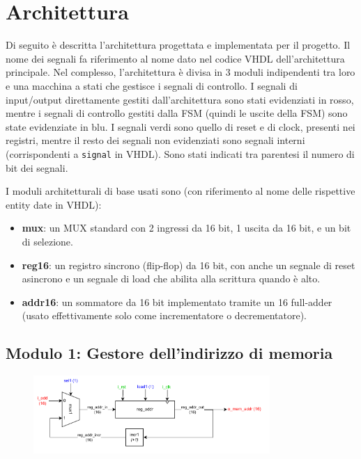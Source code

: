 \documentclass{article}
\begin{document}
\section{Architettura}
Di seguito è descritta l’architettura progettata e implementata per il progetto. Il nome dei segnali fa riferimento al nome dato nel codice VHDL dell’architettura principale. Nel complesso, l’architettura è divisa in 3 moduli indipendenti tra loro e una macchina a stati che gestisce i segnali di controllo. I segnali di input/output direttamente gestiti dall’architettura sono stati evidenziati in rosso, mentre i segnali di controllo gestiti dalla FSM (quindi le uscite della FSM) sono state evidenziate in blu. I segnali verdi sono quello di reset e di clock, presenti nei registri, mentre il resto dei segnali non evidenziati sono segnali interni (corrispondenti a \texttt{signal} in VHDL). Sono stati indicati tra parentesi il numero di bit dei segnali.

I moduli architetturali di base usati sono (con riferimento al nome delle rispettive entity date in VHDL):
\begin{itemize}
    \item \textbf{mux}: un MUX standard con 2 ingressi da 16 bit, 1 uscita da 16 bit, e un bit di selezione.
    \item \textbf{reg16}: un registro sincrono (flip-flop) da 16 bit, con anche un segnale di reset asincrono e un segnale di load che abilita alla scrittura quando è alto.
    \item \textbf{addr16}: un sommatore da 16 bit implementato tramite un 16 full-adder (usato effettivamente solo come incrementatore o decrementatore).
\end{itemize}

\subsection{Modulo 1: Gestore dell'indirizzo di memoria}

\begin{figure}[htbp]
  \centering
  \includegraphics[width=0.8\textwidth]{modulo1.pdf}
  \label{fig:Modulo 1: gestore dell'indirizzo di memoria}
\end{figure}
\end{document}
